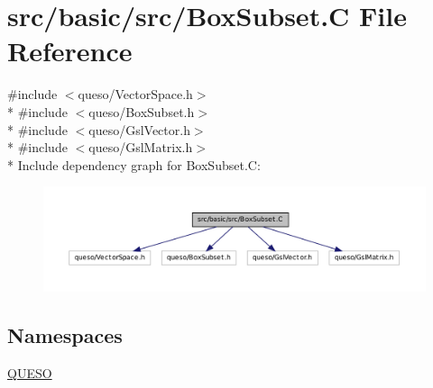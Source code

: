 \hypertarget{_box_subset_8_c}{\section{src/basic/src/\-Box\-Subset.C File Reference}
\label{_box_subset_8_c}
}
{\ttfamily \#include $<$queso/\-Vector\-Space.\-h$>$}\\*
{\ttfamily \#include $<$queso/\-Box\-Subset.\-h$>$}\\*
{\ttfamily \#include $<$queso/\-Gsl\-Vector.\-h$>$}\\*
{\ttfamily \#include $<$queso/\-Gsl\-Matrix.\-h$>$}\\*
Include dependency graph for Box\-Subset.\-C\-:
\nopagebreak
\begin{figure}[H]
\begin{center}
\leavevmode
\includegraphics[width=350pt]{_box_subset_8_c__incl}
\end{center}
\end{figure}
\subsection*{Namespaces}
\begin{DoxyCompactItemize}
\item 
\hyperlink{namespace_q_u_e_s_o}{Q\-U\-E\-S\-O}
\end{DoxyCompactItemize}
